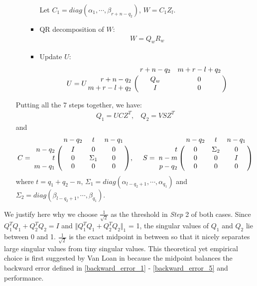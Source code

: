 \begin{enumerate}
\begin{enumerate}
\begin{itemize}
                                Let $C_1 = diag(\alpha_{1}, \cdots, \beta_{r+n-q_2})$, $W = C_1Z_{l}$.
                            \item QR decomposition of $W$:
                                \begin{align}
                                    W = Q_{w}R_{w}
                                \end{align}
                            \item Update $U$:
                                \begin{displaymath}
                                    U = U\bordermatrix{ & r+n-q_2 & m+r-l+q_2\cr
                                    \hfill r+n-q_2 & Q_{w} & 0 \cr
                                    \hfill m+r-l+q_2 & I & 0}
                                \end{displaymath}
                        \end{itemize}
            \end{enumerate}
    Putting all the 7 steps together, we have:
    \begin{align}
                Q_1 = UCZ^{T}, \ \ \ \ Q_2 = VSZ^{T}
            \end{align}
            and
            \begin{displaymath}
                C = \bordermatrix{ & n-q_2 & t & n-q_1 \cr
                \hfill n-q_2 & I & 0 & 0 \cr
                \hfill t & 0 & \Sigma_1 & 0 \cr
                \hfill m-q_1 & 0 & 0 & 0}, \  \ \ \
                S = \bordermatrix{ & n-q_2 & t & n-q_1 \cr
                \hfill t & 0 & \Sigma_2 & 0 \cr
                \hfill n-m & 0 & 0 & I \cr
                \hfill p-q_2 & 0 & 0 & 0}
        \end{displaymath}
        where $t = q_1 + q_2 - n$, $\Sigma_1 = diag(\alpha_{l-q_2+1}, \cdots, \alpha_{q_1})$ and $\Sigma_2 = diag(\beta_{l-q_2+1}, \cdots, \beta_{q_1})$.
    \end{enumerate}
    
\begin{remark}
{\rm
We justify here why we choose $\frac{1}{\sqrt{2}}$ as the threshold in \textit{Step} 2 of both cases. Since $Q_{1}^{T}Q_{1} + Q_{2}^{T}Q_{2} = I$ and $\Vert Q_{1}^{T}Q_{1} + Q_{2}^{T}Q_{2} \Vert_{1}$ = 1, the singular values of $Q_{1}$ and $Q_{2}$ lie between 0 and 1. $\frac{1}{\sqrt{2}}$ is the exact midpoint in between so that it nicely separates large singular values from tiny singular values. This theoretical yet empirical choice is first suggested by Van Loan in \cite{vanloan85} because the midpoint balances the backward error defined in \eqref{backward_error_1} - \eqref{backward_error_5} and performance.
}
\end{remark}

